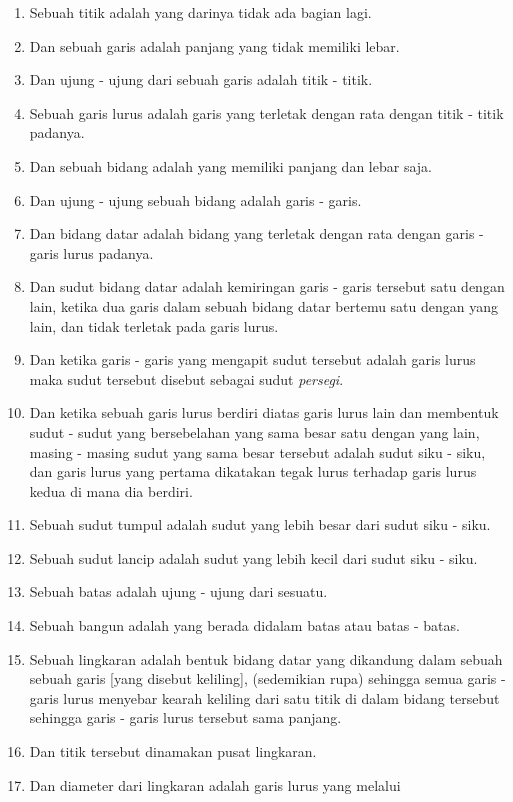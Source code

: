 \documentclass[a4paper]{book}
\begin{document}
\begin{enumerate}
\item Sebuah titik adalah yang darinya tidak ada bagian lagi.
\item Dan sebuah garis adalah panjang yang tidak memiliki lebar.
\item Dan ujung - ujung dari sebuah garis adalah titik - titik.
\item Sebuah garis lurus adalah garis yang terletak dengan rata dengan titik - titik padanya.
\item Dan sebuah bidang adalah yang memiliki panjang dan lebar saja.
\item Dan ujung - ujung sebuah bidang adalah garis - garis.
\item Dan bidang datar adalah bidang yang terletak dengan rata dengan garis - garis lurus padanya.
\item Dan sudut bidang datar adalah kemiringan garis - garis tersebut 
satu dengan lain, ketika dua garis dalam sebuah bidang datar bertemu satu dengan
yang lain, dan tidak terletak pada garis lurus.
\item Dan ketika garis - garis yang mengapit sudut tersebut adalah garis lurus maka sudut
tersebut disebut sebagai sudut \textit{persegi}.
\item Dan ketika sebuah garis lurus berdiri diatas garis lurus lain dan 
membentuk sudut - sudut yang bersebelahan yang sama besar satu dengan yang 
lain, masing - masing sudut yang sama besar tersebut adalah sudut siku - siku,
dan garis lurus yang pertama dikatakan tegak lurus terhadap garis lurus kedua
di mana dia berdiri.
\item Sebuah sudut tumpul adalah sudut yang lebih besar dari sudut siku - siku.
\item Sebuah sudut lancip adalah sudut yang lebih kecil dari sudut siku - siku.
\item Sebuah batas adalah ujung - ujung dari sesuatu.
\item Sebuah bangun adalah yang berada didalam batas atau batas - batas.
\item Sebuah lingkaran adalah bentuk bidang datar yang dikandung dalam sebuah 
sebuah garis [yang disebut keliling], (sedemikian rupa) sehingga semua 
garis - garis lurus menyebar kearah keliling dari satu titik di dalam bidang
tersebut sehingga garis - garis lurus tersebut sama panjang.
\item Dan titik tersebut dinamakan pusat lingkaran.
\item Dan diameter dari lingkaran adalah garis lurus yang melalui 

\end{enumerate}
\end{document}
